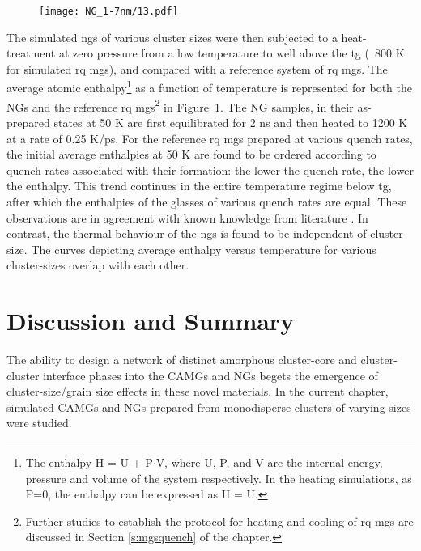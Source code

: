 \begin{figure}[!h]
	\texttt{[image: NG\_1-7nm/13.pdf]}
	\label{f:NG_enth}
\end{figure}

The simulated \gls{ng}s of various cluster sizes were then subjected to a heat-treatment at zero pressure from a low temperature to well above the \gls{tg} (~800 K for simulated \cz \gls{rq} \gls{mg}s), and compared with a reference system of \gls{rq} \gls{mg}s. The average atomic enthalpy\footnote{The enthalpy H = U + P$\cdot$V, where U, P, and V are the internal energy, pressure and volume of the system respectively. In the heating simulations, as P=0, the enthalpy can be expressed as H = U.} as a function of temperature is represented for both the NGs and the reference \cz \gls{rq} \gls{mg}s\footnote{Further studies to establish the protocol for heating and cooling of \gls{rq} \gls{mg}s are discussed in Section \ref{s:mgsquench} of the  chapter.} in Figure~\ref{f:NG_enth}. The NG samples, in their as-prepared states at 50 K are first equilibrated for 2 ns and then heated to 1200 K at a rate of 0.25 K/ps. For the reference \gls{rq} \gls{mg}s prepared at various quench rates, the initial average enthalpies at 50 K are found to be ordered according to quench rates associated with their formation: the lower the quench rate, the lower the enthalpy. This trend continues in the entire temperature regime below \gls{tg}, after which the enthalpies of the glasses of various quench rates are equal. These observations are in agreement with known knowledge from literature \cite{Berthier2016,Ediger1996}. In contrast, the thermal behaviour of the \gls{ng}s is found to be independent of cluster-size. The curves depicting average enthalpy versus temperature for various cluster-sizes overlap with each other. \par 

\section{Discussion and Summary}
The ability to design a network of distinct amorphous cluster-core and cluster-cluster interface phases into the CAMGs and NGs begets the emergence of cluster-size/grain size effects in these novel materials. In the current chapter, simulated \cz CAMGs and NGs prepared from monodisperse clusters of varying sizes were studied. \par

